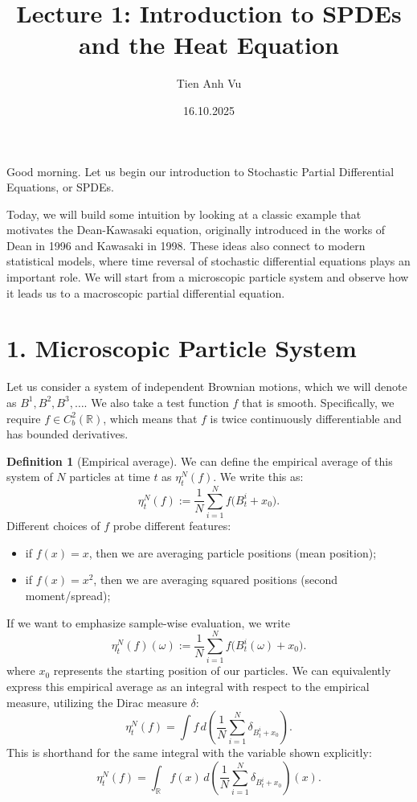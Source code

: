 \documentclass[11pt]{article}
\title{Lecture 1: Introduction to SPDEs and the Heat Equation}
\date{16.10.2025}
\author{Tien Anh Vu}
\theoremstyle{definition}
\newtheorem{definition}{Definition}
\theoremstyle{remark}
\begin{document}
\maketitle

Good morning. Let us begin our introduction to Stochastic Partial Differential Equations, or SPDEs.

Today, we will build some intuition by looking at a classic example that motivates the Dean-Kawasaki equation, originally introduced in the works of Dean in 1996 and Kawasaki in 1998. These ideas also connect to modern statistical models, where time reversal of stochastic differential equations plays an important role. We will start from a microscopic particle system and observe how it leads us to a macroscopic partial differential equation.

\section*{1. Microscopic Particle System}
Let us consider a system of independent Brownian motions, which we will denote as $B^1, B^2, B^3, \ldots$. We also take a test function $f$ that is smooth. Specifically, we require $f\in C_b^2(\mathbb{R})$, which means that $f$ is twice continuously differentiable and has bounded derivatives.

\begin{definition}[Empirical average]
We can define the empirical average of this system of $N$ particles at time $t$ as $\eta_t^N(f)$. We write this as:
\[
\eta_t^N(f):=\frac{1}{N}\sum_{i=1}^{N} f\bigl(B_t^i+x_0\bigr).
\]
Different choices of $f$ probe different features:
\begin{itemize}
\item if $f(x)=x$, then we are averaging particle positions (mean position);
\item if $f(x)=x^2$, then we are averaging squared positions (second moment/spread);
\end{itemize}
If we want to emphasize sample-wise evaluation, we write
\[
\eta_t^N(f)(\omega):=\frac{1}{N}\sum_{i=1}^{N} f\bigl(B_t^i(\omega)+x_0\bigr).
\]
where $x_0$ represents the starting position of our particles. We can equivalently express this empirical average as an integral with respect to the empirical measure, utilizing the Dirac measure $\delta$:
\[
\eta_t^N(f)=\int f\,d\!\left(\frac{1}{N}\sum_{i=1}^{N}\delta_{B_t^i+x_0}\right).
\]
This is shorthand for the same integral with the variable shown explicitly:
\[
\eta_t^N(f)=\int_{\mathbb R} f(x)\,d\!\left(\frac{1}{N}\sum_{i=1}^{N}\delta_{B_t^i+x_0}\right)(x).
\]
\end{definition}
\end{document}
